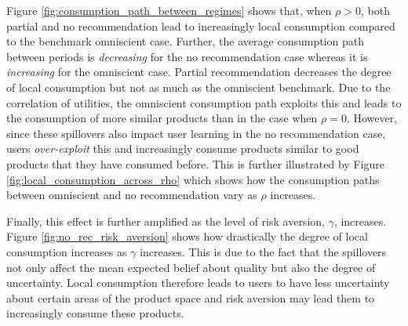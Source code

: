 \documentclass[sigconf]{acmart}
\begin{document}
Figure \ref{fig:consumption_path_between_regimes} shows that, when $\rho > 0$, both partial and no recommendation lead to increasingly local consumption compared to the benchmark omniscient case. Further, the average consumption path between periods is \textit{decreasing} for the no recommendation case whereas it is \textit{increasing} for the omniscient case. Partial recommendation decreases the degree of local consumption but not as much as the omniscient benchmark. Due to the correlation of utilities, the omniscient consumption path exploits this and leads to the consumption of more similar products than in the case when $\rho = 0$. However, since these spillovers also impact user learning in the no recommendation case, users \textit{over-exploit} this and increasingly consume products similar to good products that they have consumed before. This is further illustrated by Figure \ref{fig:local_consumption_across_rho} which shows how the consumption paths between omniscient and no recommendation vary as $\rho$ increases.

Finally, this effect is further amplified as the level of risk aversion, $\gamma$, increases. Figure \ref{fig:no_rec_risk_aversion} shows how drastically the degree of local consumption increases as $\gamma$ increases. This is due to the fact that the spillovers not only affect the mean expected belief about quality but also the degree of uncertainty. Local consumption therefore leads to users to have less uncertainty about certain areas of the product space and risk aversion may lead them to increasingly consume these products.
\end{document}
